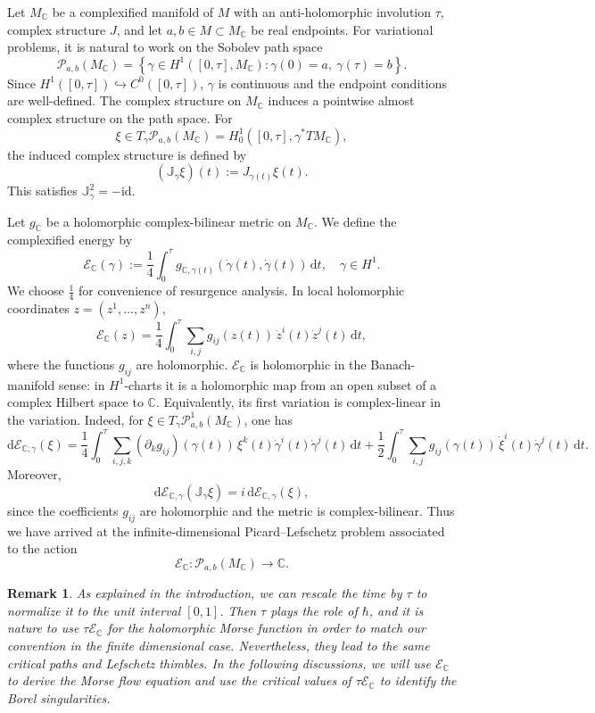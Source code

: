 \documentclass[11pt]{amsart}
\theoremstyle{plain}
\newtheorem{rmk}[thm]{Remark}
\theoremstyle{definition}
\newcommand{\C}{\mathbb{C}}
\newcommand{\dd}{\mathrm d}
\newcommand{\PP}{\mathcal{P}}
\begin{document}

Let $M_{\C}$ be a complexified manifold of $M$ with an anti-holomorphic involution $\tau$, complex structure $J$, and
let $a,b\in M\subset M_{\C}$ be real endpoints. For variational problems, it is natural to work on the Sobolev path space
\[
\mathcal P_{a,b}(M_{\C})
=
\left\{
\gamma\in H^1([0,\tau],M_{\C}) :
\gamma(0)=a,\ \gamma(\tau)=b
\right\}.
\]
Since $H^1([0,\tau])\hookrightarrow C^0([0,\tau])$, $\gamma$ is continuous and the endpoint conditions are
well-defined. The complex structure on $M_{\C}$ induces a pointwise almost complex
structure on the path space. For 
$$
\xi\in T_\gamma\mathcal P_{a,b}(M_{\C})
=
H^1_0([0,\tau],\gamma^*TM_{\C}),
$$
the induced complex structure is defined by 
\[
(\mathbb J_\gamma \xi)(t)
:=
J_{\gamma(t)}\xi(t).
\]
This satisfies $\mathbb J_\gamma^2=-\mathrm{id}$. 

Let $g_{\C}$ be a holomorphic complex-bilinear metric on
$M_{\C}$.  We define the complexified energy by
\[
\mathcal E_{\C}(\gamma)
:=
\frac{1}{4}\int_0^\tau
g_{\C,\gamma(t)}(\dot\gamma(t),\dot\gamma(t))\,\dd t,\quad \gamma\in H^1.
\]
We choose $\frac{1}{4}$ for convenience of resurgence analysis. In local holomorphic coordinates $z=(z^1,\ldots,z^n)$,
$$
\mathcal E_{\C}(z)
=
\frac{1}{4}\int_0^\tau \sum_{i,j}
g_{ij}(z(t))\,\dot z^i(t)\dot z^j(t)\,\dd t,
$$
where the functions $g_{ij}$ are holomorphic.  
$\mathcal E_{\C}$ is holomorphic in the Banach-manifold sense:
in $H^1$-charts it is a holomorphic map from an open subset of a complex
Hilbert space to $\C$.
Equivalently, its first variation is complex-linear in the variation.
Indeed, for
$
\xi\in T_\gamma\mathcal P^1_{a,b}(M_{\C})
$, one has
\[
\dd\mathcal E_{\C,\gamma}(\xi)
=
\frac{1}{4}\int_0^\tau\sum_{i,j,k}
(\partial_k g_{ij})(\gamma(t))\,\xi^k(t)\dot\gamma^i(t)\dot\gamma^j(t)\,\dd t
+\frac{1}{2}
\int_0^\tau \sum_{i,j}
g_{ij}(\gamma(t))\,\dot\xi^i(t)\dot\gamma^j(t)\,\dd t.
\]
Moreover,
\[
\dd\mathcal E_{\C,\gamma}(\mathbb J_\gamma\xi)
=i\, \dd \mathcal E_{\C,\gamma}(\xi),
\]
since the coefficients $g_{ij}$ are holomorphic and the metric is
complex-bilinear. Thus we have arrived at the infinite-dimensional Picard–Lefschetz problem associated to the action
$$\mathcal E_{\C}: \PP_{a,b}(M_{\C})\to \C. 
$$
\begin{rmk}
As explained in the introduction, we can rescale the time by $\tau$ to normalize it to the unit interval $[0,1]$. Then $\tau$ plays the role of $\hbar$, and it is nature to use $\tau \mathcal E_{\C}$ for the holomorphic Morse function in order to match our convention in the finite dimensional case. Nevertheless, they lead to the same critical paths and Lefschetz thimbles. In the following discussions, we will use $\mathcal E_{\C}$ to derive the Morse flow equation and use the critical values of $\tau \mathcal E_{\C}$ to identify the Borel singularities. 
\end{rmk}
\end{document}
